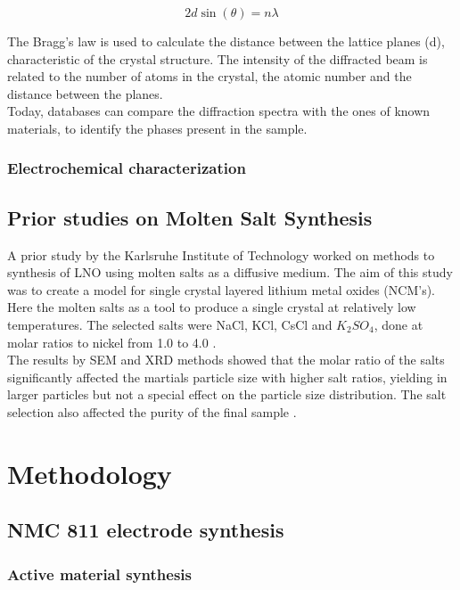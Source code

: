 \documentclass{article}
\begin{document}
\begin{equation}
2d \sin(\theta) = n\lambda   
\end{equation}

The Bragg's law is used to calculate the distance between the lattice planes (d), characteristic of the crystal structure. 
The intensity of the diffracted beam is related to the number of atoms in the crystal, the atomic number and the distance between the planes.\\

Today, databases can compare the diffraction spectra with the ones of known materials, to identify the phases present in the sample.\\

\subsubsection{Electrochemical characterization}

\subsection{Prior studies on Molten Salt Synthesis}
A prior study by the Karlsruhe Institute of Technology  worked on methods to 
synthesis of LNO using molten salts as a diffusive medium.
The aim of this study was to create a model for single crystal
layered lithium metal oxides (NCM's).\\
Here the molten salts as a tool to produce a single crystal
at relatively low temperatures.
The selected salts were NaCl, KCl, CsCl and \(K_{2}SO_{4}\), 
done at molar ratios to nickel from 1.0 to 4.0 \cite{meltingp}.\\
The results by SEM and XRD methods showed that the molar ratio
of the salts significantly affected the martials particle size with 
higher salt ratios, yielding in larger particles but not a special effect on the particle size distribution.
 The salt selection also affected the purity of the final sample \cite{meltingp}. \\
\section {Methodology} 
\subsection{NMC 811 electrode synthesis}

\subsubsection{Active material synthesis}
\end{document}

